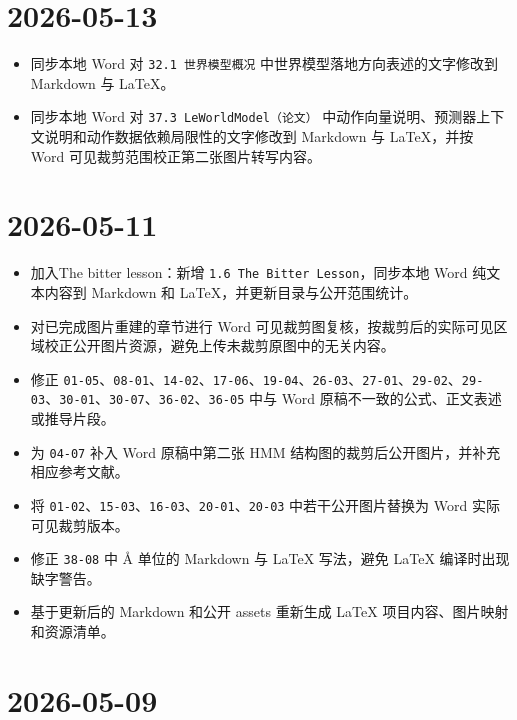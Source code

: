 \hypertarget{section-4}{%
\section{2026-05-13}\label{section-4}}

\begin{itemize}
\tightlist
\item
  同步本地 Word 对 \texttt{32.1\ 世界模型概况} 中世界模型落地方向表述的文字修改到 Markdown 与 LaTeX。
\item
  同步本地 Word 对 \texttt{37.3\ LeWorldModel（论文）} 中动作向量说明、预测器上下文说明和动作数据依赖局限性的文字修改到 Markdown 与 LaTeX，并按 Word 可见裁剪范围校正第二张图片转写内容。
\end{itemize}

\hypertarget{section-5}{%
\section{2026-05-11}\label{section-5}}

\begin{itemize}
\tightlist
\item
  加入The bitter lesson：新增 \texttt{1.6\ The\ Bitter\ Lesson}，同步本地 Word 纯文本内容到 Markdown 和 LaTeX，并更新目录与公开范围统计。
\item
  对已完成图片重建的章节进行 Word 可见裁剪图复核，按裁剪后的实际可见区域校正公开图片资源，避免上传未裁剪原图中的无关内容。
\item
  修正 \texttt{01-05}、\texttt{08-01}、\texttt{14-02}、\texttt{17-06}、\texttt{19-04}、\texttt{26-03}、\texttt{27-01}、\texttt{29-02}、\texttt{29-03}、\texttt{30-01}、\texttt{30-07}、\texttt{36-02}、\texttt{36-05} 中与 Word 原稿不一致的公式、正文表述或推导片段。
\item
  为 \texttt{04-07} 补入 Word 原稿中第二张 HMM 结构图的裁剪后公开图片，并补充相应参考文献。
\item
  将 \texttt{01-02}、\texttt{15-03}、\texttt{16-03}、\texttt{20-01}、\texttt{20-03} 中若干公开图片替换为 Word 实际可见裁剪版本。
\item
  修正 \texttt{38-08} 中 Å 单位的 Markdown 与 LaTeX 写法，避免 LaTeX 编译时出现缺字警告。
\item
  基于更新后的 Markdown 和公开 assets 重新生成 LaTeX 项目内容、图片映射和资源清单。
\end{itemize}

\hypertarget{section-6}{%
\section{2026-05-09}\label{section-6}}

